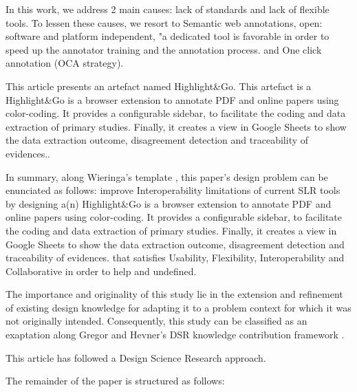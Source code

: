 \documentclass{article}
\begin{document}
In this work, we address 2 main causes: lack of standards and lack of flexible tools. To lessen these causes, we resort to Semantic web annotations, open: software and platform independent, "a dedicated tool is favorable in order to speed up the annotator training and the annotation process. and One click annotation (OCA strategy). 
    
This article presents an artefact named Highlight&Go. This artefact is a Highlight&Go is a browser extension to annotate PDF and online papers using color-coding. It provides a configurable sidebar, to facilitate the coding and data extraction of primary studies. Finally, it creates a view in Google Sheets to show the data extraction outcome, disagreement detection and traceability of evidences.. 
    
In summary, along Wieringa's template \cite{Wieringa2014}, this paper's design problem can be enunciated as follows: 
improve Interoperability limitations of current SLR tools
by designing a(n) Highlight&Go is a browser extension to annotate PDF and online papers using color-coding. It provides a configurable sidebar, to facilitate the coding and data extraction of primary studies. Finally, it creates a view in Google Sheets to show the data extraction outcome, disagreement detection and traceability of evidences.
that satisfies Usability, Flexibility, Interoperability and Collaborative
in order to help  and undefined. 
    
The importance and originality of this study lie in the extension and refinement of existing design knowledge for adapting it to a problem context for which it was not originally intended. Consequently, this study can be classified as an exaptation along Gregor and Hevner’s DSR knowledge contribution framework \cite{Gregor2013}.
      
This article has followed a Design Science Research approach.

The remainder of the paper is structured as follows: 

    
      


\end{document}
